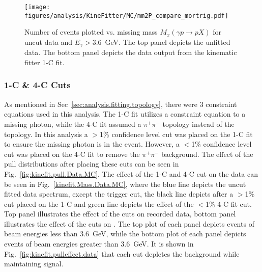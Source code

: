\begin{figure}[h!]\begin{center}
\texttt{[image: \\figures/analysis/KineFitter/MC/mm2P\_compare\_mortrig.pdf]}
\caption[Number of  events plotted vs. missing mass $M_x(\gamma p \to p X)$ for uncut data and $E_\gamma > 3.6$~GeV]{\label{fig:kinfit.effect_morMC}Number of  events plotted vs. missing mass $M_x(\gamma p \to p X)$ for uncut data and $E_\gamma > 3.6$~GeV. The top panel depicts the unfitted data. The bottom panel depicts the data output from the kinematic fitter 1-C fit.}
\end{center}\end{figure}
\FloatBarrier

\subsubsection{1-C \& 4-C Cuts}
As mentioned in Sec~\ref{sec:analysis.fitting.topology}, there were 3 constraint equations used in this analysis. The 1-C fit utilizes a constraint equation to a missing photon, while the 4-C fit assumed a $\pi^+\pi^-$ topology instead of the \epem topology. In this analysis a $>$1\% confidence level cut was placed on the 1-C fit to ensure the missing photon is in the event. However, a $<$1\% confidence level cut was placed on the 4-C fit to remove the $\pi^+\pi^-$ background. The effect of the pull distributions after placing these cuts can be seen in Fig.~\ref{fig:kinefit.pull.Data.MC}. The effect of the 1-C and 4-C cut on the data can be seen in Fig.~\ref{kinefit.Mass.Data.MC}, where the blue line depicts the uncut fitted data spectrum, except the trigger cut, the black line depicts after a $>$1\% cut placed on the 1-C and green line depicts the effect of the $<$1\% 4-C fit cut. Top panel illustrates the effect of the cuts on recorded data, bottom panel illustrates the effect of the cuts on . The top plot of each panel depicts events of beam energies less than 3.6~GeV, while the bottom plot of each panel depicts events of beam energies greater than 3.6~GeV. It is shown in Fig.~\ref{fig:kinefit.pulleffect.data} that each cut depletes the background while maintaining signal.


